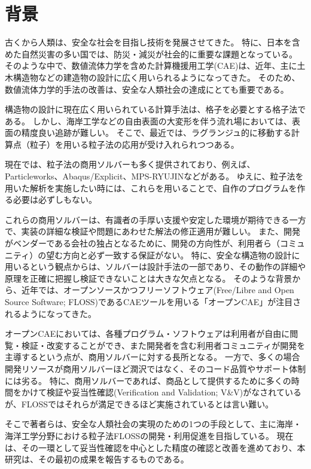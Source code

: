 \section{背景}
	古くから人類は、安全な社会を目指し技術を発展させてきた。
	特に、日本を含めた自然災害の多い国では、防災・減災が社会的に重要な課題となっている。
	そのような中で、数値流体力学を含めた計算機援用工学(CAE)は、近年、主に土木構造物などの建造物の設計に広く用いられるようになってきた。
	そのため、数値流体力学的手法の改善は、安全な人類社会の達成にとても重要である。
	
	構造物の設計に現在広く用いられている計算手法は、格子を必要とする格子法である。
	しかし、海岸工学などの自由表面の大変形を伴う流れ場においては、表面の精度良い追跡が難しい。
	そこで、最近では、ラグランジュ的に移動する計算点（粒子）を用いる粒子法の応用が受け入れられつつある。

	現在では、粒子法の商用ソルバーも多く提供されており、例えば、Particleworks\Cite{ref:particleworks}、Abaqus/Explicit\Cite{ref:abaqus}、MPS-RYUJIN\Cite{ref:ryujin}などがある。
	ゆえに、粒子法を用いた解析を実施したい時には、これらを用いることで、自作のプログラムを作る必要は必ずしもない。
	
	これらの商用ソルバーは、有識者の手厚い支援や安定した環境が期待できる一方で、実装の詳細な検証や問題にあわせた解法の修正適用が難しい。
	また、開発がベンダーである会社の独占となるために、開発の方向性が、利用者ら（コミュニティ）の望む方向と必ず一致する保証がない。
	特に、安全な構造物の設計に用いるという観点からは、ソルバーは設計手法の一部であり、その動作の詳細や原理を正確に把握し検証できないことは大きな欠点となる。
	そのような背景から、近年では、オープンソースかつフリーソフトウェア(Free/Libre and Open Source Software; FLOSS)であるCAEツールを用いる「オープンCAE」が注目されるようになってきた。

	オープンCAEにおいては、各種プログラム・ソフトウェアは利用者が自由に閲覧・検証・改変することができ、また開発者を含む利用者コミュニティが開発を主導するという点が、商用ソルバーに対する長所となる。
	一方で、多くの場合開発リソースが商用ソルバーほど潤沢ではなく、そのコード品質やサポート体制には劣る。
	特に、商用ソルバーであれば、商品として提供するために多くの時間をかけて検証や妥当性確認(Verification and Validation; V\&V)がなされているが、FLOSSではそれらが満足できるほど実施されているとは言い難い。

	そこで著者らは、安全な人類社会の実現のための1つの手段として、主に海岸・海洋工学分野における粒子法FLOSSの開発・利用促進を目指している。
	現在は、その一環として妥当性確認を中心とした精度の確認と改善を進めており、本研究は、その最初の成果を報告するものである。
	
